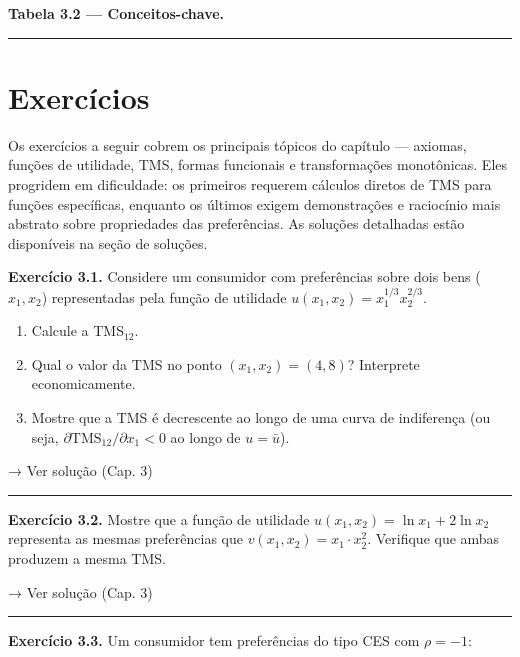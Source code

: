 \documentclass[11pt,twoside,openright]{book}
\begin{document}
\textbf{Tabela 3.2 --- Conceitos-chave.}

\begin{center}\rule{0.5\linewidth}{0.5pt}\end{center}

\section{Exercícios}\label{exercuxedcios}

Os exercícios a seguir cobrem os principais tópicos do capítulo ---
axiomas, funções de utilidade, TMS, formas funcionais e transformações
monotônicas. Eles progridem em dificuldade: os primeiros requerem
cálculos diretos de TMS para funções específicas, enquanto os últimos
exigem demonstrações e raciocínio mais abstrato sobre propriedades das
preferências. As soluções detalhadas estão disponíveis na seção de
soluções.

\textbf{Exercício 3.1.} Considere um consumidor com preferências sobre
dois bens (\(x_1, x_2\)) representadas pela função de utilidade
\(u(x_1, x_2) = x_1^{1/3} x_2^{2/3}\).

\begin{enumerate}
\def\labelenumi{(\alph{enumi})}
\item
  Calcule a TMS\(_{12}\).
\item
  Qual o valor da TMS no ponto \((x_1, x_2) = (4, 8)\)? Interprete
  economicamente.
\item
  Mostre que a TMS é decrescente ao longo de uma curva de indiferença
  (ou seja, \(\partial \text{TMS}_{12} / \partial x_1 < 0\) ao longo de
  \(u = \bar{u}\)).
\end{enumerate}

→ Ver solução (Cap. 3)

\begin{center}\rule{0.5\linewidth}{0.5pt}\end{center}

\textbf{Exercício 3.2.} Mostre que a função de utilidade
\(u(x_1, x_2) = \ln x_1 + 2 \ln x_2\) representa as mesmas preferências
que \(v(x_1, x_2) = x_1 \cdot x_2^2\). Verifique que ambas produzem a
mesma TMS.

→ Ver solução (Cap. 3)

\begin{center}\rule{0.5\linewidth}{0.5pt}\end{center}

\textbf{Exercício 3.3.} Um consumidor tem preferências do tipo CES com
\(\rho = -1\):
\end{document}
